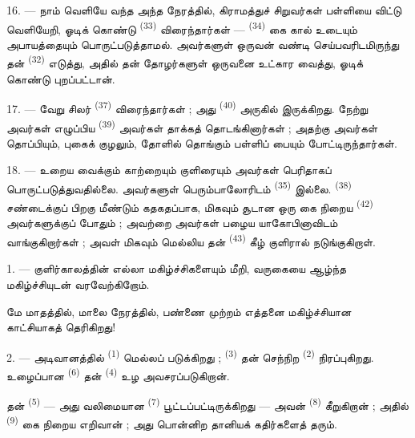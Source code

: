 16. --- நாம் வெளியே வந்த அந்த நேரத்தில், கிராமத்துச் சிறுவர்கள்
பள்ளியை விட்டு வெளியேறி, ஓடிக் கொண்டு 
\textsuperscript{(33)} விரைந்தார்கள் — 
\textsuperscript{(34)} கை கால் உடையும் அபாயத்தையும் பொருட்படுத்தாமல்.
அவர்களுள் ஒருவன் வண்டி செய்பவரிடமிருந்து தன் 
\textsuperscript{(32)} எடுத்து, அதில் தன் தோழர்களுள் ஒருவனை உட்கார
வைத்து, ஓடிக் கொண்டு புறப்பட்டான்.

17. --- வேறு சிலர்  \textsuperscript{(37)}
விரைந்தார்கள் ; அது  \textsuperscript{(40)} அருகில்
இருக்கிறது. நேற்று அவர்கள் எழுப்பிய 
\textsuperscript{(39)} அவர்கள் தாக்கத் தொடங்கினார்கள் ; அதற்கு அவர்கள்
தொப்பியும், புகைக் குழலும், தோளில் தொங்கும் பள்ளிப் பையும்
போட்டிருந்தார்கள்.

18. --- உறைய வைக்கும் காற்றையும் குளிரையும் அவர்கள் பெரிதாகப்
பொருட்படுத்துவதில்லை. அவர்களுள் பெரும்பாலோரிடம்  \textsuperscript{(35)} இல்லை. 
\textsuperscript{(38)} சண்டைக்குப் பிறகு மீண்டும் கதகதப்பாக, மிகவும்
சூடான ஒரு கை நிறைய  \textsuperscript{(42)}
அவர்களுக்குப் போதும் ; அவற்றை அவர்கள் பழைய 
யாகோபினாவிடம் வாங்குகிறார்கள் ; அவள் மிகவும் மெல்லிய தன்
 \textsuperscript{(43)} கீழ் குளிரால்
நடுங்குகிறாள்.

\VUsaut{3.0mm}
\VUsaut{3.0mm}

\VUsaut{4.0mm}

1. --- குளிர்காலத்தின் எல்லா மகிழ்ச்சிகளையும் மீறி,  வருகையை ஆழ்ந்த மகிழ்ச்சியுடன் வரவேற்கிறோம்.

மே மாதத்தில், மாலை நேரத்தில், பண்ணை முற்றம் எத்தனை மகிழ்ச்சியான
காட்சியாகத் தெரிகிறது!

2. --- அடிவானத்தில்  \textsuperscript{(1)} மெல்லப்
படுக்கிறது ;  \textsuperscript{(3)} தன் செந்நிற
 \textsuperscript{(2)} நிரப்புகிறது. உழைப்பான
 \textsuperscript{(6)} தன் 
\textsuperscript{(4)} உழ அவசரப்படுகிறான்.

தன்  \textsuperscript{(5)} — அது வலிமையான
 \textsuperscript{(7)} பூட்டப்பட்டிருக்கிறது —
அவன்  \textsuperscript{(8)} கீறுகிறான் ; அதில் 
\textsuperscript{(9)} கை நிறைய  எறிவான் ; அது பொன்னிற
தானியக் கதிர்களைத் தரும்.


